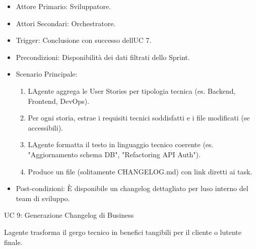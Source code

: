 \documentclass[12pt, a4paper]{article}
\begin{document}
\begin{itemize}
\item
  Attore Primario: Sviluppatore.
\item
  Attori Secondari: Orchestratore.
\item
  Trigger: Conclusione con successo dell\textquotesingle UC 7.
\item
  Precondizioni: Disponibilità dei dati filtrati dello Sprint.
\item
  Scenario Principale:

  \begin{enumerate}
  \def\labelenumi{\arabic{enumi}.}
  \item
    L\textquotesingle Agente aggrega le User Stories per tipologia
    tecnica (es. Backend, Frontend, DevOps).
  \item
    Per ogni storia, estrae i requisiti tecnici soddisfatti e i file
    modificati (se accessibili).
  \item
    L\textquotesingle Agente formatta il testo in linguaggio tecnico
    coerente (es. "Aggiornamento schema DB", "Refactoring API Auth").
  \item
    Produce un file (solitamente CHANGELOG.md) con link diretti ai task.
  \end{enumerate}
\item
  Post-condizioni: È disponibile un changelog dettagliato per
  l\textquotesingle uso interno del team di sviluppo.
\end{itemize}

UC 9: Generazione Changelog di Business

L\textquotesingle agente trasforma il gergo tecnico in benefici
tangibili per il cliente o l\textquotesingle utente finale.
\end{document}
